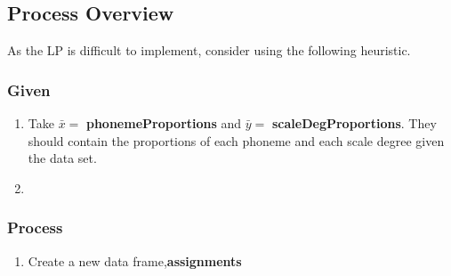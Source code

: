 \subsection{Process Overview}
As the LP is difficult to implement, consider using the following heuristic.
\subsubsection{Given}
\begin{enumerate}
\item  Take $\bar{x} =$ \textbf{phonemeProportions} and $\bar{y} =$ \textbf{scaleDegProportions}. They should contain the proportions of each phoneme and each scale degree given the data set. 
\item 
\end{enumerate}
\subsubsection{Process}
\begin{enumerate}
\item Create a new data frame,\textbf{assignments}
\end{enumerate}
